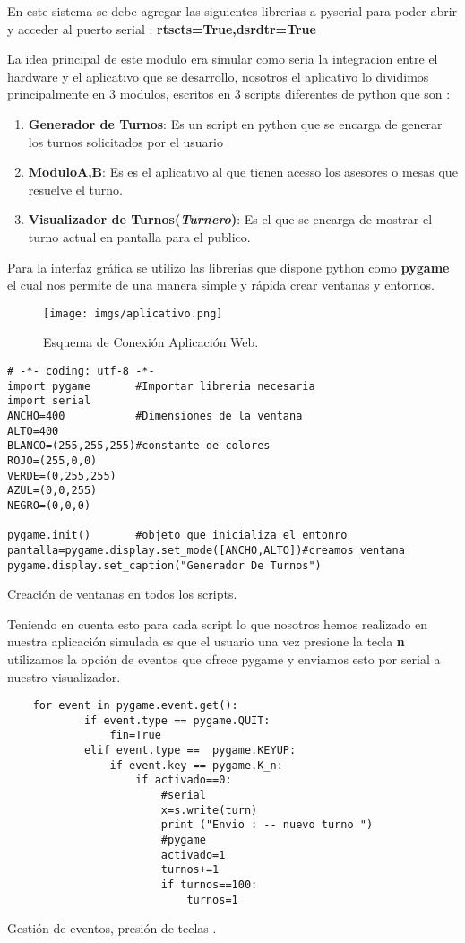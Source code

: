 \documentclass[paper=a4, fontsize=12pt]{article} 		%
\numberwithin{equation}{section}						%
\numberwithin{table}{section} 							%
\begin{document}
En este sistema se debe agregar las siguientes librerias a pyserial para poder abrir y acceder al puerto serial : \textbf{rtscts=True,dsrdtr=True}

La idea principal de este modulo era simular como seria la integracion entre el hardware y el aplicativo que se desarrollo, nosotros el aplicativo lo dividimos principalmente en 3 modulos, escritos en 3 scripts diferentes de python  que son : 
\begin{enumerate}
\item \textbf{Generador de Turnos}: Es un script en python que se encarga de generar los turnos solicitados por el usuario
\item \textbf{ModuloA,B}: Es es el aplicativo al que tienen acesso los asesores o mesas que resuelve el turno. 
\item \textbf{Visualizador de Turnos(\textit{Turnero})}: Es el que se encarga de mostrar el turno actual en pantalla para el publico.
\end{enumerate}
Para la interfaz gráfica se utilizo las librerias que dispone python como \textbf{pygame} el cual nos permite de una manera simple y rápida crear ventanas y entornos.
\begin{figure}[H]
  \centering
     \texttt{[image: imgs/aplicativo.png]}
  \caption{Esquema de Conexión Aplicación Web.}
    \label{fig:senal}
\end{figure}

\begin{listing}[H]
	\begin{verbatim}
# -*- coding: utf-8 -*-			
import pygame		#Importar libreria necesaria
import serial
ANCHO=400			#Dimensiones de la ventana
ALTO=400	
BLANCO=(255,255,255)#constante de colores
ROJO=(255,0,0)
VERDE=(0,255,255)
AZUL=(0,0,255)
NEGRO=(0,0,0)

pygame.init()		#objeto que inicializa el entonro	
pantalla=pygame.display.set_mode([ANCHO,ALTO])#creamos ventana
pygame.display.set_caption("Generador De Turnos") 
\end{verbatim}
\caption{Creación  de ventanas en todos los scripts.}
    \label{window}
\end{listing}
Teniendo en cuenta esto para cada script lo que nosotros hemos realizado en nuestra aplicación simulada es que el usuario una vez presione la tecla \textbf{n}  utilizamos la opción de eventos que ofrece pygame y enviamos esto por serial a nuestro visualizador. 

\begin{listing}[H]
	\begin{verbatim}
	for event in pygame.event.get():
			if event.type == pygame.QUIT:
				fin=True
			elif event.type ==	pygame.KEYUP:
				if event.key == pygame.K_n:
					if activado==0:
						#serial
						x=s.write(turn)
						print ("Envio : -- nuevo turno ")
						#pygame
						activado=1
						turnos+=1
						if turnos==100:
							turnos=1
\end{verbatim}
\caption{Gestión de eventos, presión de teclas .}
    \label{presion}
\end{listing}
\end{document}
